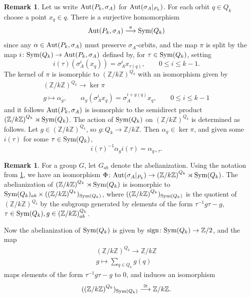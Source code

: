 \documentclass{amsart}
\theoremstyle{definition}
\newtheorem{rem}[equation]{Remark}
\theoremstyle{definition}
\newcommand{\aut}{\textnormal{Aut}}
\newcommand{\sym}{\textnormal{Sym}}
\numberwithin{equation}{subsection}
\begin{document}
\begin{rem}\label{apprem:semidirectaut}
Let us write $\aut(P_{k},\sigma_{A})$ for $\aut(\sigma_{A}|_{P_{k}})$. For each orbit $q \in Q_{k}$ choose a point $x_{q} \in q$. There is a surjective homomorphism
$$\aut(P_{k},\sigma_{A}) \stackrel{\pi}\longrightarrow \sym(Q_{k})$$
since any $\alpha \in \aut(P_{k},\sigma_{A})$ must preserve $\sigma_{A}$-orbits, and the map $\pi$ is split by the map $i \colon \sym(Q_{k}) \to \aut(P_{k},\sigma_{A})$ defined by, for $\tau \in \sym(Q_{k})$, setting
$$i(\tau)(\sigma_{A}^{i}(x_{q})) = \sigma_{A}^{i}x_{\tau(q)}, \qquad 0 \le i \le k-1.$$
The kernel of $\pi$ is isomorphic to $\left(\mathbb{Z}/k \mathbb{Z}\right)^{Q_{k}}$ with an isomorphism given by
\begin{equation*}
\begin{gathered}
\left(\mathbb{Z}/k \mathbb{Z}\right)^{Q_{k}} \to \ker \pi\\
g \mapsto \alpha_{g}, \qquad \alpha_{g}(\sigma_{A}^{i}x_{q}) = \sigma_{A}^{i+g(q)}x_{q}, \qquad 0 \le i \le k-1
\end{gathered}
\end{equation*}
and it follows $\aut(P_{k},\sigma_{A})$ is isomorphic to the semidirect product $\left(\mathbb{Z}/k\mathbb{Z}\right)^{Q_{k}} \rtimes \sym(Q_{k})$. The action of $\sym(Q_{k})$ on $\left(\mathbb{Z}/k\mathbb{Z}\right)^{Q_{k}}$ is determined as follows. Let $g \in \left(\mathbb{Z}/k\mathbb{Z}\right)^{Q_{k}}$, so $g \colon Q_{k} \to \mathbb{Z}/k\mathbb{Z}$. Then $\alpha_{g} \in \ker \pi$, and given some $i(\tau)$ for some $\tau \in \sym(Q_{k})$,
$$i(\tau)^{-1}\alpha_{g}i(\tau) = \alpha_{g \circ \tau}.$$
\end{rem}

\begin{rem}\label{apprem:abelsigngyr}
  For a group $G$, let $G_{ab}$ denote the abelianization. Using the notation from \ref{apprem:semidirectaut}, we have an isomorphism $\Phi \colon \aut(\sigma_{A}|_{P_{k}}) \to \left(\mathbb{Z}/k\mathbb{Z}\right)^{Q_{k}} \rtimes \sym(Q_{k})$. The abelianization of $\left(\mathbb{Z}/k\mathbb{Z}\right)^{Q_{k}} \rtimes \sym(Q_{k})$ is isomorphic to $\sym(Q_{k})_{ab} \times (\left(\mathbb{Z}/k\mathbb{Z}\right)^{Q_{k}})_{\sym(Q_{k})}$,
  where $(\left(\mathbb{Z}/k\mathbb{Z}\right)^{Q_{k}})_{\sym(Q_{k})}$ is the quotient of $\left(\mathbb{Z}/k\mathbb{Z}\right)^{Q_{k}}$ by the subgroup generated by elements of the form $\tau^{-1}g\tau - g$, $\tau \in \sym(Q_{k}), g \in \left(\mathbb{Z}/k\mathbb{Z}\right)^{Q_{k}}_{ab}$.

  Now the abelianization of $\sym(Q_{k})$ is given by $\textnormal{sign} \colon \sym(Q_{k}) \to \mathbb{Z}/2$, and the map
\begin{equation*}
\begin{gathered}
\left(\mathbb{Z}/k\mathbb{Z}\right)^{Q_{k}} \to \mathbb{Z}/k\mathbb{Z}\\
g \mapsto \sum_{q \in Q_{k}}g(q)
\end{gathered}
\end{equation*}
maps elements of the form $\tau^{-1}g\tau-g$ to 0, and induces an isomorphism
$$(\left(\mathbb{Z}/k\mathbb{Z}\right)^{Q_{k}})_{\sym(Q_{k})} \stackrel{\cong}\longrightarrow \mathbb{Z}/k\mathbb{Z}.$$
\end{rem}
\end{document}
